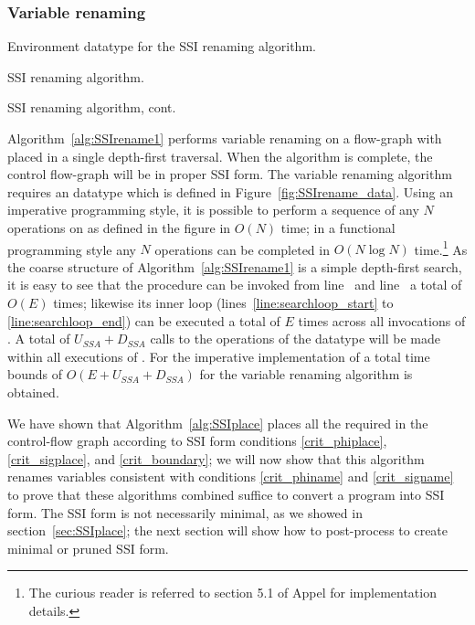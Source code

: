 \documentclass[12pt,titlepage,twoside]{article}
\begin{document}
\subsubsection{Variable renaming}
\begin{myfigure}[p]\small

\caption{Environment datatype for the SSI renaming algorithm.}
\label{fig:SSIrename_data}
\end{myfigure}
\begin{myalgorithm}\small

\caption{SSI renaming algorithm.}\label{alg:SSIrename1}
\end{myalgorithm}
\begin{myalgorithm}\small

\caption{SSI renaming algorithm, cont.}\label{alg:SSIrename2}
\end{myalgorithm}
Algorithm~\ref{alg:SSIrename1} performs variable renaming on a
flow-graph with placed  in a single depth-first
traversal.  When the algorithm is complete, the control flow-graph
will be in proper SSI form.  The variable renaming algorithm requires
an  datatype which is defined in
Figure~\ref{fig:SSIrename_data}.  Using an imperative programming
style, it is possible to perform a sequence of any $N$ operations on
 as defined in the figure in $O(N)$ time; in a
functional programming style any $N$ operations can be completed in
$O(N \log N)$ time.\footnote{The curious reader is referred to section
5.1 of Appel \cite{appel:modern} for implementation details.}  As the
coarse structure of Algorithm~\ref{alg:SSIrename1} is a simple
depth-first search, it is easy to see that the  procedure
can be invoked from line~ and
line~ a total of $O(E)$ times; likewise its
inner loop (lines~\ref{line:searchloop_start} to
\ref{line:searchloop_end}) can be executed a total of $E$ times across
all invocations of .  A total of $U_{SSA}+D_{SSA}$ calls
to the operations of the  datatype will be made
within all executions of .  For the imperative
implementation of  a total time bounds of
$O(E+U_{SSA}+D_{SSA})$ for the variable renaming algorithm is
obtained.

We have shown that Algorithm~\ref{alg:SSIplace} places all the
required  in the control-flow graph according to SSI
form conditions \ref{crit_phiplace}, \ref{crit_sigplace}, and
\ref{crit_boundary}; we will now show that this algorithm renames
variables consistent with conditions \ref{crit_phiname} and
\ref{crit_signame} to prove that these algorithms combined suffice to
convert a program into SSI form.  The SSI form is not necessarily
minimal, as we showed in section~\ref{sec:SSIplace}; the next
section will show how to post-process to create minimal or pruned SSI
form.
\end{document}
